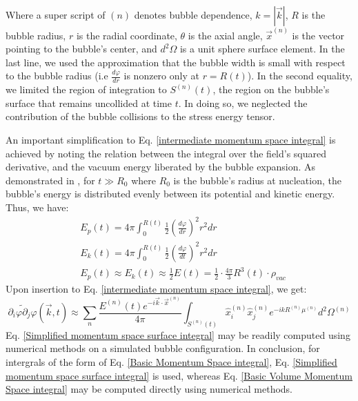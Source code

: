 \documentclass{article}
\begin{document}
Where a super script of $(n)$ denotes bubble dependence, $k = |\overrightarrow{k}|$, $R$ is the bubble radius, $r$ is the
radial coordinate, $\theta$ is the axial angle, $\overrightarrow{x}^{(n)}$ is the vector pointing to the bubble's center, and $d^2\Omega$ is a unit sphere surface element. In the last line, we used the approximation that the bubble width is small with respect to the bubble radius (i.e $\frac{d\varphi}{dr}$ is nonzero only at $r=R(t)$). 
In the second equality, we limited the region of integration to $S^{(n)}(t)$, the region on the bubble's surface that remains uncollided at time $t$. In doing so, we neglected the contribution of the bubble collisions to the stress energy tensor.

An important simplification to Eq. \ref{intermediate momentum space integral} is achieved by noting the relation between the 
integral over the field's squared derivative, and the vacuum energy liberated by the bubble expansion.
As demonstrated in \cite{kosowsky_envelope_approximation}, for $t \gg R_0$ where $R_0$ is the
bubble's radius at nucleation, the bubble's energy is distributed evenly between its potential and kinetic energy.
Thus, we have:
\begin{equation}
    \begin{aligned}
        & E_p(t) = 4\pi \int_0^{R(t)}\frac{1}{2} {(\frac{d\varphi}{dr})}^2r^2dr\\
        & E_k(t) = 4\pi \int_0^{R(t)}\frac{1}{2}{(\frac{d\varphi}{dt})}^2 r^2 dr\\
        & E_p(t)\approx E_k(t) \approx \frac{1}{2}E(t)=\frac{1}{2}\cdot \frac{4\pi}{3} R^3(t) \cdot \rho_{vac}
    \end{aligned}
\end{equation}
Upon insertion to Eq. \ref{intermediate momentum space integral}, we get:
\begin{equation} \label{Simplified momentum space surface integral}
    \widetilde{\partial_i\varphi\partial_j\varphi}(\overrightarrow{k}, t) \approx \sum_n \frac{E^{(n)}(t)e^{-i\overrightarrow{k}\cdot\overrightarrow{x}^{(n)}}}{4\pi}\int_{S^{(n)}(t)} \hat{x}_i^{(n)}\hat{x}_j^{(n)} e^{-ikR^{(n)} \mu^{(n)}} d^2 \Omega^{(n)}
\end{equation}
Eq. \ref{Simplified momentum space surface integral} may be readily computed using numerical methods on a simulated bubble configuration.
In conclusion, for intergrals of the form of Eq. \ref{Basic Momentum Space integral}, Eq. \ref{Simplified momentum space surface integral} is used, whereas
Eq. \ref{Basic Volume Momentum Space integral} may be computed directly using numerical methods.
\end{document}
